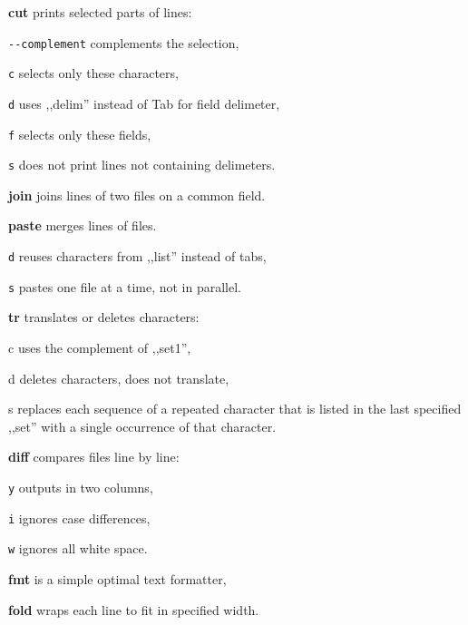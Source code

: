 \begin{enumx}
	\item [\cmdblack] \textbf{cut} prints selected parts of lines:
	\item [] \texttt{-}\texttt{-}\texttt{complement} complements the selection,
	\item [\texttt{c}] selects only these characters,
	\item [\texttt{d}] uses ,,delim'' instead of Tab for field delimeter,
	\item [\texttt{f}] selects only these fields,
	\item [\texttt{s}] does not print lines not containing delimeters.
	\item [\cmdblack] \textbf{join} joins lines of two files on a common field.
	\item [\cmdblack] \textbf{paste} merges lines of files.
	\item [\texttt{d}] reuses characters from ,,list'' instead of tabs,
	\item [\texttt{s}] pastes one file at a time, not in parallel.
	\item [\cmdblack] \textbf{tr} translates or deletes characters:
	\item [c] uses the complement of ,,set1'',
	\item [d] deletes characters, does not translate,
	\item [s] replaces each sequence of a repeated character that is listed 
	in the last specified ,,set'' with a single occurrence of that character.
\end{enumx}

\begin{enumx}
	\item [\cmd] \textbf{diff} compares files line by line:
	\item [\texttt{y}] outputs in two columns,
	\item [\texttt{i}] ignores case differences,
	\item [\texttt{w}] ignores all white space.
\end{enumx}

\begin{enumx}
	\item [\cmd] \textbf{fmt} is a simple optimal text formatter, 
	\item [\cmd] \textbf{fold} wraps each line to fit in specified width.
\end{enumx}

